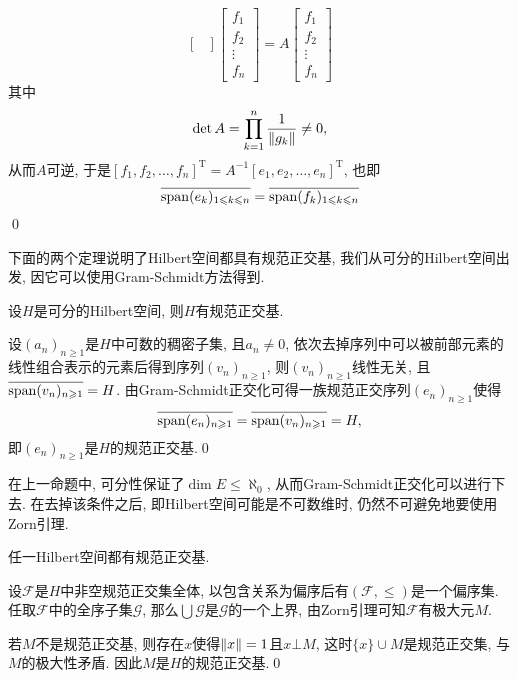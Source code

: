 \begin{Proof}
\[\begin{bmatrix}
	\end{bmatrix}\begin{bmatrix}
	f_1\\f_2\\\vdots\\f_n
	\end{bmatrix}=A\begin{bmatrix}
	f_1\\f_2\\\vdots\\f_n
	\end{bmatrix}
	\]
	其中
	\[
	\det A=\prod_{k=1}^n\frac{1}{\left\| g_k \right\|}\ne 0,
	\]
	从而$ A $可逆, 于是$ [f_1,f_2, \dots,f_n]^\mathrm T=A^{-1}[e_1,e_2, \dots,e_n]^\mathrm T $, 也即
	\[
	\overline{\operatorname{span}(e_k)_{1\leqslant k\leqslant n}}=\overline{\operatorname{span}(f_k)_{1\leqslant k\leqslant n}}
	\]
	\qed
	\end{Proof}
	
	下面的两个定理说明了Hilbert空间都具有规范正交基, 我们从可分的Hilbert空间出发, 因它可以使用Gram-Schmidt方法得到.
	
	\begin{Proposition}
	设$ H $是可分的Hilbert空间, 则$ H $有规范正交基.
	\end{Proposition}
	\begin{Proof}
	设$ (a_n)_{n\geqslant 1} $是$ H $中可数的稠密子集, 且$ a_n\ne 0 $, 依次去掉序列中可以被前部元素的线性组合表示的元素后得到序列$ (v_n)_{n\geqslant 1} $, 则$ (v_n)_{n\geqslant 1} $线性无关, 且$ \overline{\operatorname{span}(v_n)_{n\geqslant 1}}=H $. 由Gram-Schmidt正交化可得一族规范正交序列$ (e_n)_{n\geqslant 1} $使得
	\[
	\overline{\operatorname{span}(e_n)_{n\geqslant 1}}=\overline{\operatorname{span}(v_n)_{n\geqslant 1}}=H,
	\]
	即$ (e_n)_{n\geqslant 1} $是$ H $的规范正交基.\qed
	\end{Proof}
	在上一命题中, 可分性保证了$ \dim E\leqslant\aleph_0 $, 从而Gram-Schmidt正交化可以进行下去. 在去掉该条件之后, 即Hilbert空间可能是不可数维时, 仍然不可避免地要使用Zorn引理.
	
	\begin{Theorem}
	任一Hilbert空间都有规范正交基.
	\end{Theorem}
	\begin{Proof}
	设$ \mathcal F $是$ H $中非空规范正交集全体, 以包含关系为偏序后有$ (\mathcal F,\leqslant) $是一个偏序集. 任取$ \mathcal F $中的全序子集$ \mathcal G $, 那么$ \bigcup\mathcal G $是$ \mathcal G $的一个上界, 由Zorn引理可知$ \mathcal F $有极大元$ M $.
	
	若$ M $不是规范正交基, 则存在$ x $使得$ \left\| x \right\|=1 $且$ x\bot M $, 这时$ \{ x \}\cup M $是规范正交集, 与$ M $的极大性矛盾. 因此$ M $是$ H $的规范正交基.\qed
	\end{Proof}
	
